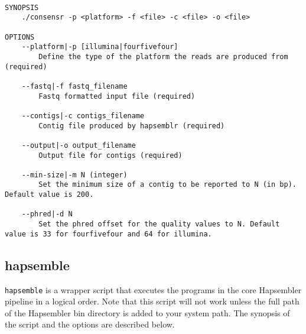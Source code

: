 \documentclass[12pt,a4paper]{report}
\begin{document}
\begin{lstlisting}

SYNOPSIS
    ./consensr -p <platform> -f <file> -c <file> -o <file> 

OPTIONS 
    --platform|-p [illumina|fourfivefour] 
        Define the type of the platform the reads are produced from (required) 

    --fastq|-f fastq_filename 
        Fastq formatted input file (required) 

    --contigs|-c contigs_filename 
        Contig file produced by hapsemblr (required) 

    --output|-o output_filename 
        Output file for contigs (required) 

    --min-size|-m N (integer) 
        Set the minimum size of a contig to be reported to N (in bp). Default value is 200. 

    --phred|-d N 
        Set the phred offset for the quality values to N. Default value is 33 for fourfivefour and 64 for illumina. 

\end{lstlisting}

\subsection{hapsemble}
\label{hapscript}

\texttt{hapsemble} is a wrapper script that executes the programs in the core Hapsembler pipeline in a logical order. Note that this script will not work unless the full path of the Hapsembler bin directory is added to your system path. The synopsis of the script and the options are described below.
\end{document}
